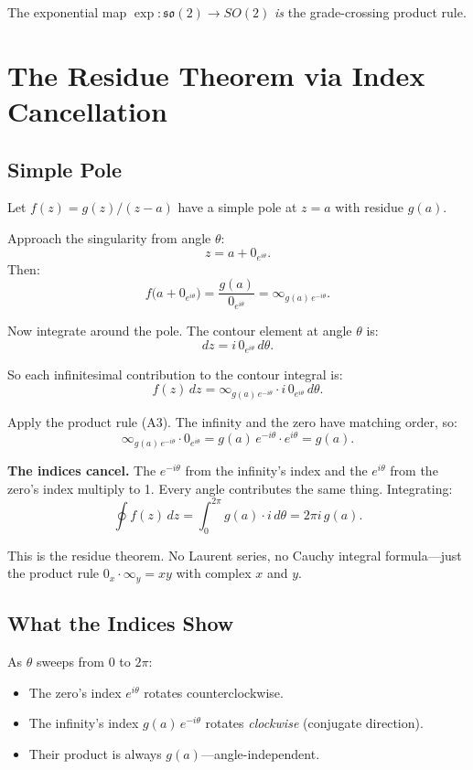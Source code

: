 \documentclass[11pt,a4paper]{article}
\newcommand{\vi}[1]{0_{#1}}          %
\newcommand{\vinf}[1]{\infty_{#1}}   %
\begin{document}
The exponential map $\exp\colon \mathfrak{so}(2) \to SO(2)$ \emph{is} the grade-crossing product rule.

\section{The Residue Theorem via Index Cancellation}

\subsection{Simple Pole}

Let $f(z) = g(z)/(z - a)$ have a simple pole at $z = a$ with residue $g(a)$.

Approach the singularity from angle $\theta$:
\[
  z = a + \vi{e^{i\theta}}.
\]
Then:
\[
  f\bigl(a + \vi{e^{i\theta}}\bigr) = \frac{g(a)}{\vi{e^{i\theta}}} = \vinf{g(a)\, e^{-i\theta}}.
\]

Now integrate around the pole. The contour element at angle $\theta$ is:
\[
  dz = i\,\vi{e^{i\theta}}\,d\theta.
\]

So each infinitesimal contribution to the contour integral is:
\[
  f(z)\,dz = \vinf{g(a)\,e^{-i\theta}} \cdot i\,\vi{e^{i\theta}}\,d\theta.
\]

Apply the product rule (A3). The infinity and the zero have matching order, so:
\[
  \vinf{g(a)\,e^{-i\theta}} \cdot \vi{e^{i\theta}}
  = g(a)\,e^{-i\theta} \cdot e^{i\theta}
  = g(a).
\]

\textbf{The indices cancel.} The $e^{-i\theta}$ from the infinity's index and the $e^{i\theta}$ from the zero's index multiply to 1. Every angle contributes the same thing. Integrating:
\[
  \oint f(z)\,dz = \int_0^{2\pi} g(a) \cdot i\,d\theta = 2\pi i\, g(a).
\]

This is the residue theorem. No Laurent series, no Cauchy integral formula---just the product rule $\vi{x} \cdot \vinf{y} = xy$ with complex $x$ and $y$.

\subsection{What the Indices Show}

As $\theta$ sweeps from $0$ to $2\pi$:
\begin{itemize}[nosep]
  \item The zero's index $e^{i\theta}$ rotates counterclockwise.
  \item The infinity's index $g(a)\,e^{-i\theta}$ rotates \emph{clockwise} (conjugate direction).
  \item Their product is always $g(a)$---angle-independent.
\end{itemize}
\end{document}
